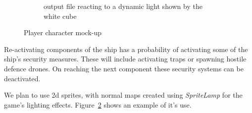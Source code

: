 \begin{figure}[ht]
\begin{subfigure}{.5\textwidth}
  \caption{output file reacting to a dynamic light shown by the white cube}
  \label{fig:sub2:pl}
\end{subfigure}
\caption{Player character mock-up}
\label{fig:player}
\end{figure}

Re-activating components of the ship has a probability of activating some of the ship's security measures. These will include activating traps or spawning hostile defence drones. On reaching the next component these security systems can be deactivated.



We plan to use 2d sprites, with normal maps created using \textit{SpriteLamp} for the game's lighting effects. Figure~\ref{fig:player} shows an example of it's use.